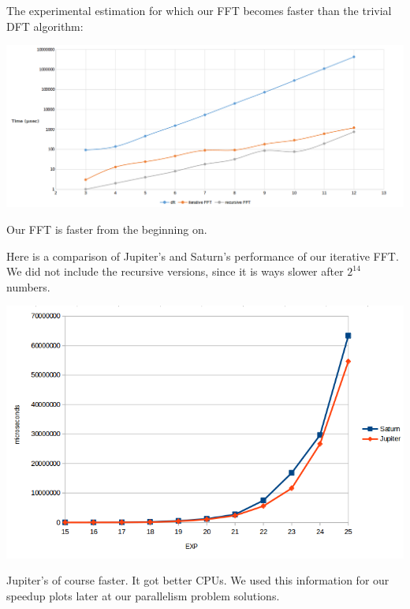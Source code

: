 The experimental estimation for which our FFT becomes faster than the trivial DFT algorithm:
\begin{center}
\includegraphics[width=\textwidth]{dft_comp.png}
\end{center}
Our FFT is faster from the beginning on.

Here is a comparison of Jupiter's and Saturn's performance of our iterative FFT. We did not include the recursive versions, since it is ways slower after \(2^{14}\) numbers.
\begin{center}
\includegraphics[width=\textwidth]{seq_performance.png}
\end{center}
Jupiter's of course faster. It got better CPUs. We used this information for our speedup plots later at our parallelism problem solutions.